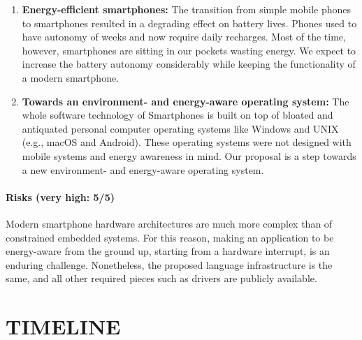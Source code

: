 \documentclass[12pt,english]{amsart}
\begin{document}
\begin{enumerate}
\item \textbf{Energy-efficient smartphones:}
    The transition from simple mobile phones to smartphones resulted in a
    degrading effect on battery lives.
    Phones used to have autonomy of weeks and now require daily recharges.
    Most of the time, however, smartphones are sitting in our pockets wasting
    energy.
    We expect to increase the battery autonomy considerably while keeping the
    functionality of a modern smartphone.
\item \textbf{Towards an environment- and energy-aware operating system:}
    The whole software technology of Smartphones is built on top of bloated and
    antiquated personal computer operating systems like Windows and UNIX (e.g.,
    macOS and Android).
    These operating systems were not designed with mobile systems and energy
    awareness in mind.
    Our proposal is a step towards a new environment- and energy-aware
    operating system.
\end{enumerate}

\paragraph{\textbf{Risks (very high: 5/5)}}
Modern smartphone hardware architectures are much more complex than of
constrained embedded systems.
For this reason, making an application to be energy-aware from the ground up,
starting from a hardware interrupt, is an enduring challenge.
Nonetheless, the proposed language infrastructure is the same, and all other
required pieces such as drivers are publicly available.

\section{TIMELINE}
\end{document}

